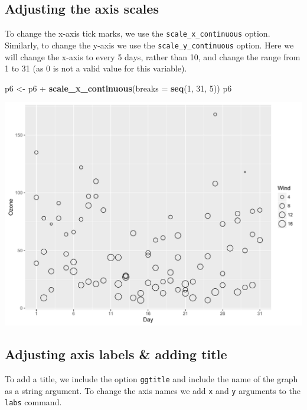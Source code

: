 \documentclass[]{article}
\newenvironment{Shaded}{\begin{snugshade}}{\end{snugshade}}
\newcommand{\KeywordTok}[1]{\textcolor[rgb]{0.13,0.29,0.53}{\textbf{{#1}}}}
\newcommand{\DataTypeTok}[1]{\textcolor[rgb]{0.13,0.29,0.53}{{#1}}}
\newcommand{\DecValTok}[1]{\textcolor[rgb]{0.00,0.00,0.81}{{#1}}}
\newcommand{\StringTok}[1]{\textcolor[rgb]{0.31,0.60,0.02}{{#1}}}
\newcommand{\NormalTok}[1]{{#1}}
\begin{document}
\subsection{Adjusting the axis
scales}\label{adjusting-the-axis-scales-1}

To change the x-axis tick marks, we use the
\texttt{scale\_x\_continuous} option. Similarly, to change the y-axis we
use the \texttt{scale\_y\_continuous} option. Here we will change the
x-axis to every 5 days, rather than 10, and change the range from 1 to
31 (as 0 is not a valid value for this variable).

\begin{Shaded}
\begin{Highlighting}[]
\NormalTok{p6 <-}\StringTok{ }\NormalTok{p6 +}\StringTok{ }\KeywordTok{scale_x_continuous}\NormalTok{(}\DataTypeTok{breaks =} \KeywordTok{seq}\NormalTok{(}\DecValTok{1}\NormalTok{, }\DecValTok{31}\NormalTok{, }\DecValTok{5}\NormalTok{))}
\NormalTok{p6}
\end{Highlighting}
\end{Shaded}

\begin{center}\includegraphics{0_all_posts_pdf/wscatter_4-1} \end{center}

\subsection{Adjusting axis labels \& adding
title}\label{adjusting-axis-labels-adding-title-4}

To add a title, we include the option \texttt{ggtitle} and include the
name of the graph as a string argument. To change the axis names we add
\texttt{x} and \texttt{y} arguments to the \texttt{labs} command.
\end{document}

